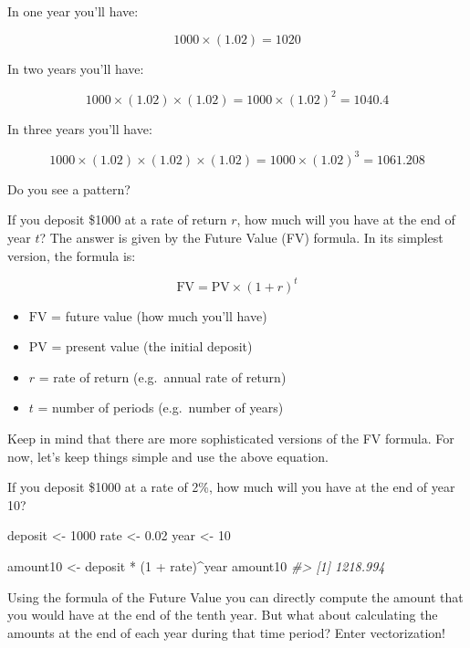 \documentclass[
]{book}
\newenvironment{Shaded}{\begin{snugshade}}{\end{snugshade}}
\newcommand{\CommentTok}[1]{\textcolor[rgb]{0.56,0.35,0.01}{\textit{#1}}}
\newcommand{\DecValTok}[1]{\textcolor[rgb]{0.00,0.00,0.81}{#1}}
\newcommand{\FloatTok}[1]{\textcolor[rgb]{0.00,0.00,0.81}{#1}}
\newcommand{\NormalTok}[1]{#1}
\newcommand{\OtherTok}[1]{\textcolor[rgb]{0.56,0.35,0.01}{#1}}
\newcommand{\SpecialCharTok}[1]{\textcolor[rgb]{0.00,0.00,0.00}{#1}}
\begin{document}
In one year you'll have:

\[
1000 \times (1.02) = 1020
\]

In two years you'll have:

\[
1000 \times (1.02) \times (1.02) = 1000 \times (1.02)^2 = 1040.4
\]

In three years you'll have:

\[
1000 \times (1.02) \times (1.02) \times (1.02) = 1000 \times (1.02)^3 = 1061.208
\]

Do you see a pattern?

If you deposit \$1000 at a rate of return \(r\), how much will you have at the
end of year \(t\)? The answer is given by the Future Value (FV) formula. In its
simplest version, the formula is:

\[
\text{FV} = \text{PV} \times (1 + r)^t
\]

\begin{itemize}
\item
  \(\text{FV}\) = future value (how much you'll have)
\item
  \(\text{PV}\) = present value (the initial deposit)
\item
  \(r\) = rate of return (e.g.~annual rate of return)
\item
  \(t\) = number of periods (e.g.~number of years)
\end{itemize}

Keep in mind that there are more sophisticated versions of the FV formula.
For now, let's keep things simple and use the above equation.

If you deposit \$1000 at a rate of 2\%, how much will you have at the end of
year 10?

\begin{Shaded}
\begin{Highlighting}[]
\NormalTok{deposit }\OtherTok{\textless{}{-}} \DecValTok{1000}
\NormalTok{rate }\OtherTok{\textless{}{-}} \FloatTok{0.02}
\NormalTok{year }\OtherTok{\textless{}{-}} \DecValTok{10}

\NormalTok{amount10 }\OtherTok{\textless{}{-}}\NormalTok{ deposit }\SpecialCharTok{*}\NormalTok{ (}\DecValTok{1} \SpecialCharTok{+}\NormalTok{ rate)}\SpecialCharTok{\^{}}\NormalTok{year}
\NormalTok{amount10}
\CommentTok{\#\textgreater{} [1] 1218.994}
\end{Highlighting}
\end{Shaded}

Using the formula of the Future Value you can directly compute the amount
that you would have at the end of the tenth year. But what about calculating the
amounts at the end of each year during that time period? Enter vectorization!
\end{document}
